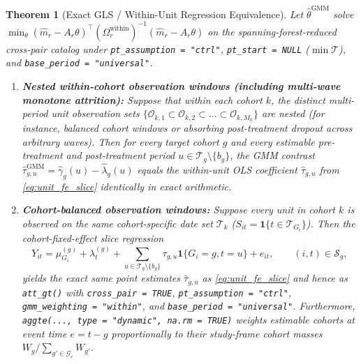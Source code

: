 \documentclass[11pt]{article}
\newtheorem{theorem}{Theorem}
\theoremstyle{definition}
\theoremstyle{remark}
\begin{document}
\begin{theorem}[Exact GLS / Within-Unit Regression Equivalence]\label{thm:equiv}
Let $\hat{\theta}^{\mathrm{GMM}}$ solve $\min_\theta (\hat{m}_r - A_r \theta)^\top (\Omega_r^{\mathrm{within}})^{-1} (\hat{m}_r - A_r \theta)$ on the spanning-forest-reduced cross-pair catalog under \texttt{pt\_assumption = "ctrl"}, \texttt{pt\_start = NULL} ($\min\mathcal{T}$), and \texttt{base\_period = "universal"}.
\begin{enumerate}
\item[(a)] \textbf{Nested within-cohort observation windows (including multi-wave monotone attrition):} Suppose that within each cohort $k$, the distinct multi-period unit observation sets $\{\mathcal{O}_{k,1} \subset \mathcal{O}_{k,2} \subset \dots \subset \mathcal{O}_{k,M_k}\}$ are nested (for instance, balanced cohort windows or absorbing post-treatment dropout across arbitrary waves). Then for every target cohort $g$ and every estimable pre-treatment and post-treatment period $u \in \mathcal{T}_g \setminus \{b_g\}$, the GMM contrast $\hat{\tau}^{\mathrm{GMM}}_{g,u} = \hat{\gamma}_g(u) - \hat{\lambda}_g(u)$ equals the within-unit OLS coefficient $\hat{\tau}_{g,u}$ from \eqref{eq:unit_fe_slice} identically in exact arithmetic.
\item[(b)] \textbf{Cohort-balanced observation windows:} Suppose every unit in cohort $k$ is observed on the same cohort-specific date set $\mathcal{T}_k$ ($S_{it} = \mathbf{1}\{t \in \mathcal{T}_{G_i}\}$). Then the cohort-fixed-effect slice regression
\[
Y_{it} = \mu_{G_i}^{(g)} + \lambda_t^{(g)} + \sum_{u \in \mathcal{T}_g \setminus \{b_g\}} \tau_{g,u} \mathbf{1}\{G_i = g, t = u\} + e_{it}, \qquad (i,t) \in \mathcal{S}_g,
\]
yields the exact same point estimates $\hat{\tau}_{g,u}$ as \eqref{eq:unit_fe_slice} and hence as \texttt{att\_gt()} with \texttt{cross\_pair = TRUE}, \texttt{pt\_assumption = "ctrl"}, \texttt{gmm\_weighting = "within"}, and \texttt{base\_period = "universal"}. Furthermore, \texttt{aggte(..., type = "dynamic", na.rm = TRUE)} weights estimable cohorts at event time $e = t - g$ proportionally to their study-frame cohort masses $W_g / \sum_{g' \in \mathcal{G}_e} W_{g'}$.
\end{enumerate}
\end{theorem}
\end{document}
